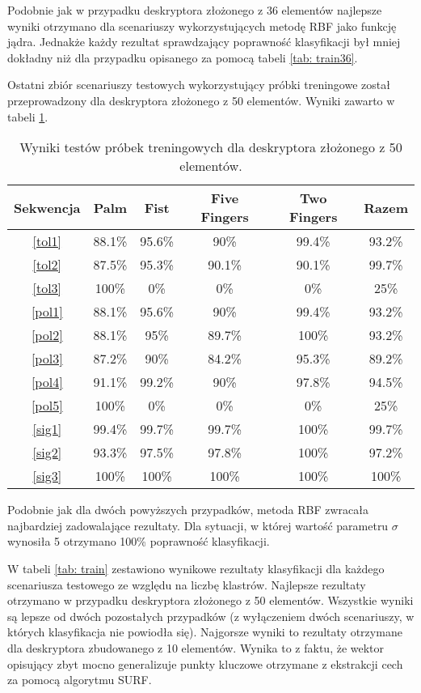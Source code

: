 Podobnie jak w przypadku deskryptora złożonego z 36 elementów najlepsze wyniki otrzymano dla scenariuszy wykorzystujących metodę RBF jako funkcję jądra. Jednakże każdy rezultat sprawdzający poprawność klasyfikacji był mniej dokładny niż dla przypadku opisanego za pomocą tabeli \ref{tab: train36}.

Ostatni zbiór scenariuszy testowych wykorzystujący próbki treningowe został przeprowadzony dla deskryptora złożonego z 50 elementów. Wyniki zawarto w tabeli \ref{tab: train50}.
\begin{table} [h!]
	\centering
	\begin{tabular}{|c|c|c|c|c|c|}
		\hline
		\textbf{Sekwencja} 	& \textbf{Palm} & \textbf{Fist} & \textbf{Five Fingers} & \textbf{Two Fingers} & \textbf{Razem} \\ \hline
		\ref{tol1} 	& 88.1\% 		& 95.6\%		& 90\%		& 99.4\% 	& 93.2\% \\ \hline
		\ref{tol2} 	& 87.5\% 		& 95.3\%		& 90.1\%	& 90.1\% 	& 99.7\% \\ \hline
		\ref{tol3}	& 100\%			& 0\%			& 0\%		& 0\% 		& 25\% \\ \hline \hline
		\ref{pol1} 	& 88.1\% 		& 95.6\%		& 90\%		& 99.4\% 	& 93.2\% \\ \hline
		\ref{pol2} 	& 88.1\% 		& 95\%			& 89.7\%	& 100\% 	& 93.2\% \\ \hline
		\ref{pol3}	& 87.2\%		& 90\%			& 84.2\%	& 95.3\% 	& 89.2\% \\ \hline
		\ref{pol4}	& 91.1\%		& 99.2\%		& 90\%		& 97.8\% 	& 94.5\% \\ \hline
		\ref{pol5}	& 100\%			& 0\%			& 0\%		& 0\% 		& 25\% \\ \hline \hline
		\ref{sig1}	& 99.4\% 		& 99.7\%		& 99.7\%	& 100\% 	& 99.7\% \\ \hline
		\ref{sig2}	& 93.3\% 		& 97.5\%		& 97.8\%	& 100\% 	& 97.2\% \\ \hline
		\ref{sig3}	& 100\%			& 100\%			& 100\%		& 100\% 	& 100\% \\ \hline
	\end{tabular}
	\caption{Wyniki testów próbek treningowych dla deskryptora złożonego z 50 elementów.}
	\label{tab: train50}
\end{table}
Podobnie jak dla dwóch powyższych przypadków, metoda RBF zwracała najbardziej zadowalające rezultaty. Dla sytuacji, w której wartość parametru $\sigma$ wynosiła 5 otrzymano 100\% poprawność klasyfikacji. 

W tabeli \ref{tab: train} zestawiono wynikowe rezultaty klasyfikacji dla każdego scenariusza testowego ze względu na liczbę klastrów. Najlepsze rezultaty otrzymano w przypadku deskryptora złożonego z 50 elementów. Wszystkie wyniki są lepsze od dwóch pozostałych przypadków (z wyłączeniem dwóch scenariuszy, w których klasyfikacja nie powiodła się). Najgorsze wyniki to rezultaty otrzymane dla deskryptora zbudowanego z 10 elementów. Wynika to z faktu, że wektor opisujący zbyt mocno generalizuje punkty kluczowe otrzymane z ekstrakcji cech za pomocą algorytmu SURF.  

